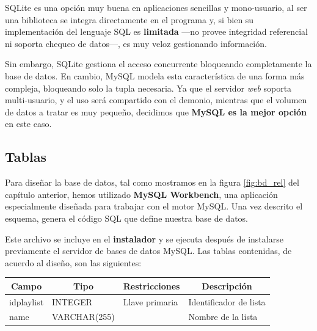 SQLite es una opción muy buena en aplicaciones sencillas y mono-usuario, al ser una biblioteca se integra directamente en el programa y, si bien su implementación del lenguaje \acrshort{SQL} es \textbf{limitada} ---no provee integridad referencial ni soporta chequeo de datos---, es muy veloz gestionando información.

Sin embargo, SQLite gestiona el acceso concurrente bloqueando completamente la base de datos. En cambio, MySQL modela esta característica de una forma más compleja, bloqueando solo la tupla necesaria. Ya que el servidor \textit{web} soporta multi-usuario, y el uso será compartido con el demonio, mientras que el volumen de datos a tratar es muy pequeño, decidimos que \textbf{MySQL es la mejor opción} en este caso.

\subsection{Tablas}

Para diseñar la base de datos, tal como mostramos en la figura \ref{fig:bd_rel} del capítulo anterior, hemos utilizado \textbf{MySQL Workbench}, una aplicación especialmente diseñada para trabajar con el motor MySQL. Una vez descrito el esquema, genera el código \acrshort{SQL} que define nuestra base de datos.

Este archivo se incluye en el \textbf{instalador} y se ejecuta después de instalarse previamente el servidor de bases de datos MySQL. Las tablas contenidas, de acuerdo al diseño, son las siguientes:

\smallskip

\begin{center}
	\begin{tabular}{|l|l|l|l|}
		\hline \multicolumn{1}{|c|}{\textbf{Campo}} & \multicolumn{1}{c|}{\textbf{Tipo}} & \multicolumn{1}{c|}{\textbf{Restricciones}} & \multicolumn{1}{c|}{\textbf{Descripción}} \\ 
		\hline idplaylist & INTEGER & Llave primaria & Identificador de lista \\ 
		\hline name & VARCHAR(255) & & Nombre de la lista \\ 
		\hline 
	\end{tabular}
	\smallskip
\end{center}

\smallskip

\smallskip

